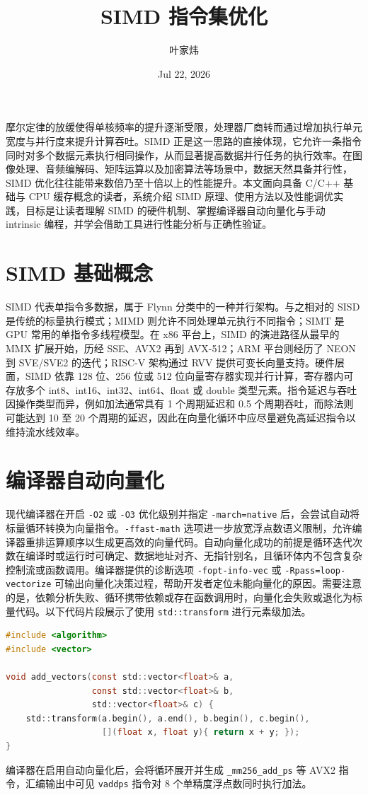 \title{SIMD 指令集优化}
\author{叶家炜}
\date{Jul 22, 2026}
\maketitle
摩尔定律的放缓使得单核频率的提升逐渐受限，处理器厂商转而通过增加执行单元宽度与并行度来提升计算吞吐。SIMD 正是这一思路的直接体现，它允许一条指令同时对多个数据元素执行相同操作，从而显著提高数据并行任务的执行效率。在图像处理、音频编解码、矩阵运算以及加密算法等场景中，数据天然具备并行性，SIMD 优化往往能带来数倍乃至十倍以上的性能提升。本文面向具备 C/C++ 基础与 CPU 缓存概念的读者，系统介绍 SIMD 原理、使用方法以及性能调优实践，目标是让读者理解 SIMD 的硬件机制、掌握编译器自动向量化与手动 intrinsic 编程，并学会借助工具进行性能分析与正确性验证。\par
\chapter{SIMD 基础概念}
SIMD 代表单指令多数据，属于 Flynn 分类中的一种并行架构。与之相对的 SISD 是传统的标量执行模式；MIMD 则允许不同处理单元执行不同指令；SIMT 是 GPU 常用的单指令多线程模型。在 x86 平台上，SIMD 的演进路径从最早的 MMX 扩展开始，历经 SSE、AVX2 再到 AVX-512；ARM 平台则经历了 NEON 到 SVE/SVE2 的迭代；RISC-V 架构通过 RVV 提供可变长向量支持。硬件层面，SIMD 依靠 128 位、256 位或 512 位向量寄存器实现并行计算，寄存器内可存放多个 int8、int16、int32、int64、float 或 double 类型元素。指令延迟与吞吐因操作类型而异，例如加法通常具有 1 个周期延迟和 0.5 个周期吞吐，而除法则可能达到 10 至 20 个周期的延迟，因此在向量化循环中应尽量避免高延迟指令以维持流水线效率。\par
\chapter{编译器自动向量化}
现代编译器在开启 \texttt{-O2} 或 \texttt{-O3} 优化级别并指定 \texttt{-march=native} 后，会尝试自动将标量循环转换为向量指令。\texttt{-ffast-math} 选项进一步放宽浮点数语义限制，允许编译器重排运算顺序以生成更高效的向量代码。自动向量化成功的前提是循环迭代次数在编译时或运行时可确定、数据地址对齐、无指针别名，且循环体内不包含复杂控制流或函数调用。编译器提供的诊断选项 \texttt{-fopt-info-vec} 或 \texttt{-Rpass=loop-vectorize} 可输出向量化决策过程，帮助开发者定位未能向量化的原因。需要注意的是，依赖分析失败、循环携带依赖或存在函数调用时，向量化会失败或退化为标量代码。以下代码片段展示了使用 \texttt{std::transform} 进行元素级加法。\par
\begin{lstlisting}[language=c]
#include <algorithm>
#include <vector>

void add_vectors(const std::vector<float>& a,
                 const std::vector<float>& b,
                 std::vector<float>& c) {
    std::transform(a.begin(), a.end(), b.begin(), c.begin(),
                   [](float x, float y){ return x + y; });
}
\end{lstlisting}
编译器在启用自动向量化后，会将循环展开并生成 \texttt{\_{}mm256\_{}add\_{}ps} 等 AVX2 指令，汇编输出中可见 \texttt{vaddps} 指令对 8 个单精度浮点数同时执行加法。\par
